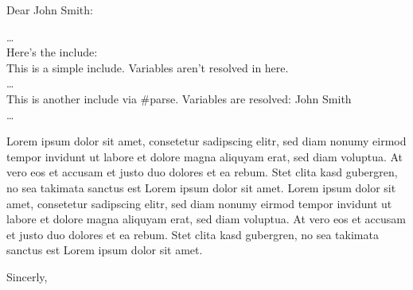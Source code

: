 \documentclass[a4paper]{letter}
\begin{document}
\begin{letter}{}

\opening{Dear John Smith:}

\ldots \\
Here's the include: \\ 
This is a simple include. Variables aren't resolved in here.
 \\
\ldots \\
This is another include via \#parse. Variables are resolved: John Smith
 \\
\ldots

Lorem ipsum dolor sit amet, consetetur sadipscing elitr, sed diam nonumy eirmod tempor invidunt ut labore et dolore magna aliquyam erat, sed diam voluptua. At vero eos et accusam et justo duo dolores et ea rebum. Stet clita kasd gubergren, no sea takimata sanctus est Lorem ipsum dolor sit amet. Lorem ipsum dolor sit amet, consetetur sadipscing elitr, sed diam nonumy eirmod tempor invidunt ut labore et dolore magna aliquyam erat, sed diam voluptua. At vero eos et accusam et justo duo dolores et ea rebum. Stet clita kasd gubergren, no sea takimata sanctus est Lorem ipsum dolor sit amet.

\closing{Sincerly,} 
\end{letter}
\end{document}
